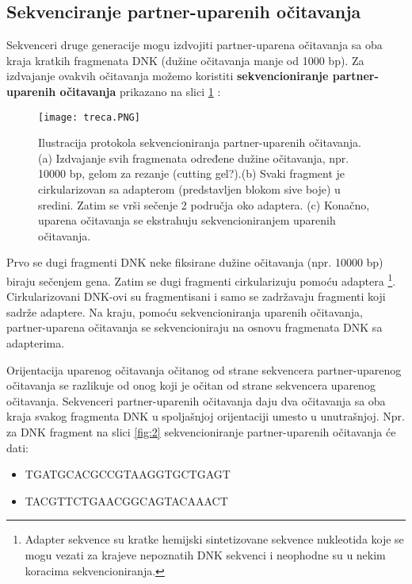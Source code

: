 \documentclass[12pt,oneside]{memoir}
\begin{document}
\newpage

\subsection{Sekvenciranje partner-uparenih očitavanja}

Sekvenceri druge generacije mogu izdvojiti partner-uparena očitavanja sa oba kraja kratkih fragmenata DNK (dužine očitavanja manje od 1000 bp). Za izdvajanje ovakvih očitavanja možemo koristiti \textbf{sekvencioniranje partner-uparenih očitavanja} prikazano na slici \ref{fig:3} :

\begin{figure}[!ht]
  \centering
  \texttt{[image: treca.PNG]}
  \caption{Ilustracija protokola sekvencioniranja partner-uparenih očitavanja. (a) Izdvajanje
svih fragmenata određene dužine očitavanja, npr. 10000 bp, gelom za rezanje (cutting gel?).(b) Svaki
fragment je cirkularizovan sa adapterom (predstavljen blokom sive boje)
u sredini. Zatim se vrši sečenje 2 područja oko adaptera. (c)
Konačno, uparena očitavanja se ekstrahuju sekvencioniranjem uparenih očitavanja.}
\label{fig:3}
\end{figure}

 Prvo se dugi fragmenti DNK neke fiksirane dužine očitavanja (npr. 10000 bp) biraju sečenjem gena. Zatim se dugi fragmenti cirkularizuju pomoću adaptera \footnote{Adapter sekvence su kratke hemijski sintetizovane sekvence
nukleotida koje se mogu vezati za krajeve nepoznatih DNK sekvenci i neophodne su u nekim koracima sekvencioniranja.}. Cirkularizovani DNK-ovi su fragmentisani i samo se zadržavaju fragmenti koji sadrže adaptere. Na kraju, pomoću sekvencioniranja uparenih očitavanja, partner-uparena očitavanja se sekvencioniraju na osnovu fragmenata DNK sa adapterima.

Orijentacija uparenog očitavanja očitanog od strane sekvencera partner-uparenog očitavanja
se razlikuje od onog koji je očitan od strane sekvencera uparenog očitavanja. Sekvenceri partner-uparenih očitavanja daju dva očitavanja sa oba kraja svakog fragmenta DNK u spoljašnjoj orijentaciji umesto u unutrašnjoj. Npr. za DNK fragment na slici \ref{fig:2} sekvencioniranje partner-uparenih očitavanja će dati:
\begin{itemize}
    \item {TGATGCACGCCGTAAGGTGCTGAGT}
    \item {TACGTTCTGAACGGCAGTACAAACT}
\end{itemize}
\end{document}
